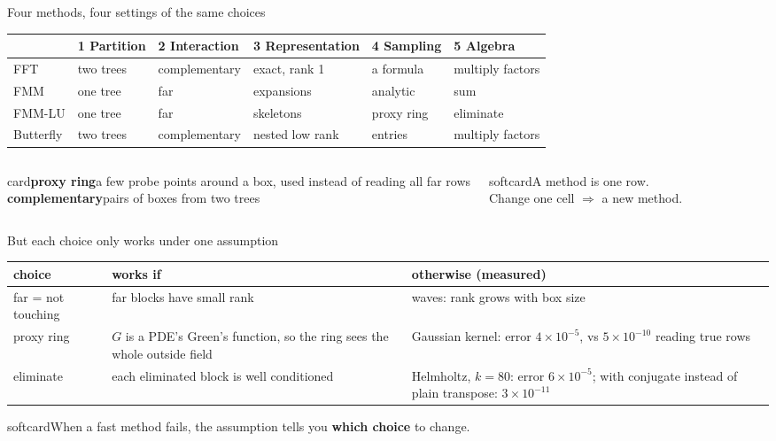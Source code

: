 \documentclass[aspectratio=169,10pt,t]{beamer}
\newcommand{\defn}[2]{{\color{teal}\bfseries #1}\;\;#2}
\newcommand{\defbox}[1]{\begin{beamercolorbox}[rounded=true,sep=.8ex]{card}\scriptsize #1\end{beamercolorbox}}
\newcommand{\punch}[1]{\begin{beamercolorbox}[rounded=true,sep=1ex]{softcard}\centering\small #1\end{beamercolorbox}}
\begin{document}
\begin{frame}{Four methods, four settings of the same choices}\label{s:table}
\vspace{2mm}
\footnotesize
\renewcommand{\arraystretch}{1.4}\setlength{\tabcolsep}{4pt}
\begin{tabular}{@{}B{1.6cm}L{2.3cm}L{2.2cm}L{2.4cm}L{2.2cm}L{2.3cm}@{}}
\toprule
& \color{teal}1 Partition & \color{teal}2 Interaction & \color{teal}3 Representation & \color{teal}4 Sampling & \color{teal}5 Algebra\\
\midrule
FFT & two trees & complementary & exact, rank 1 & a formula & multiply factors\\
FMM & one tree & far & expansions & analytic & sum\\
FMM-LU & one tree & far & skeletons & proxy ring & eliminate\\
Butterfly & two trees & complementary & nested low rank & entries & multiply factors\\
\bottomrule
\end{tabular}
\vspace{4mm}
\begin{columns}[T,onlytextwidth]
\defbox{\defn{proxy ring}{a few probe points around a box, used instead of reading all far rows}\\
\defn{complementary}{pairs of boxes from two trees}}
\punch{A method is one row.\\ Change one cell $\Rightarrow$ a new method.}
\end{columns}
\end{frame}

\begin{frame}{But each choice only works under one assumption}\label{s:assume}
\vspace{2mm}
\small
\renewcommand{\arraystretch}{1.5}
\begin{tabular}{@{}H{2.6cm}L{4.4cm}L{6.6cm}@{}}
\toprule
choice & works if & otherwise (measured)\\
\midrule
far = not touching & far blocks have small rank & waves: rank grows with box size\\
proxy ring & $G$ is a PDE's Green's function, so the ring sees the whole outside field & Gaussian kernel: error $4\times10^{-5}$, vs $5\times10^{-10}$ reading true rows\\
eliminate & each eliminated block is well conditioned & Helmholtz, $k=80$: error $6\times10^{-5}$; with conjugate instead of plain transpose: $3\times10^{-11}$\\
\bottomrule
\end{tabular}
\vspace{5mm}
\punch{When a fast method fails, the assumption tells you \textbf{which choice} to change.}
\end{frame}
\end{document}
